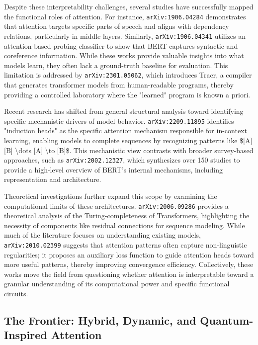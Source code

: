 \documentclass[11pt]{article}
\begin{document}
Despite these interpretability challenges, several studies have successfully mapped the functional roles of attention. For instance, \texttt{arXiv:1906.04284} demonstrates that attention targets specific parts of speech and aligns with dependency relations, particularly in middle layers. Similarly, \texttt{arXiv:1906.04341} utilizes an attention-based probing classifier to show that BERT captures syntactic and coreference information. While these works provide valuable insights into what models learn, they often lack a ground-truth baseline for evaluation. This limitation is addressed by \texttt{arXiv:2301.05062}, which introduces Tracr, a compiler that generates transformer models from human-readable programs, thereby providing a controlled laboratory where the "learned" program is known a priori.

Recent research has shifted from general structural analysis toward identifying specific mechanistic drivers of model behavior. \texttt{arXiv:2209.11895} identifies "induction heads" as the specific attention mechanism responsible for in-context learning, enabling models to complete sequences by recognizing patterns like \$[A][B] \textbackslash{}dots [A] \textbackslash{}to [B]\$. This mechanistic view contrasts with broader survey-based approaches, such as \texttt{arXiv:2002.12327}, which synthesizes over 150 studies to provide a high-level overview of BERT's internal mechanisms, including representation and architecture.

Theoretical investigations further expand this scope by examining the computational limits of these architectures. \texttt{arXiv:2006.09286} provides a theoretical analysis of the Turing-completeness of Transformers, highlighting the necessity of components like residual connections for sequence modeling. While much of the literature focuses on understanding existing models, \texttt{arXiv:2010.02399} suggests that attention patterns often capture non-linguistic regularities; it proposes an auxiliary loss function to guide attention heads toward more useful patterns, thereby improving convergence efficiency. Collectively, these works move the field from questioning whether attention is interpretable toward a granular understanding of its computational power and specific functional circuits.

\subsection{The Frontier: Hybrid, Dynamic, and Quantum-Inspired Attention}
\end{document}
